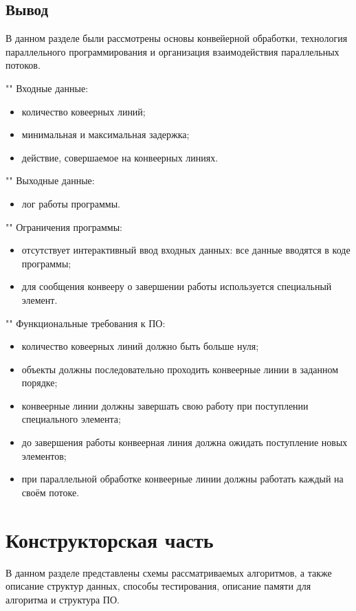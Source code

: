 \documentclass[12pt]{report}
\begin{document}
\section*{Вывод}
В данном разделе были рассмотрены основы конвейерной обработки, технология параллельного программирования и
организация взаимодействия параллельных потоков.

""\newline
Входные данные:
\begin{itemize}
	\item количество ковеерных линий;
	\item минимальная и максимальная задержка;
	\item действие, совершаемое на конвеерных линиях.
\end{itemize}

""\newline
Выходные данные:
\begin{itemize}
	\item лог работы программы.
\end{itemize}

""\newline
Ограничения программы:
\begin{itemize}
	\item отсутствует интерактивный ввод входных данных: все данные вводятся в коде программы;
	\item для сообщения конвееру о завершении работы используется специальный элемент.
\end{itemize}

""\newline
Функциональные требования к ПО:
\begin{itemize}
	\item количество ковеерных линий должно быть больше нуля;
	\item объекты должны последовательно проходить конвеерные линии в заданном порядке;
	\item конвеерные линии должны завершать свою работу при поступлении специального элемента;
	\item до завершения работы конвеерная линия должна ожидать поступление новых элементов;
	\item при параллельной обработке конвеерные линии должны работать каждый на своём потоке.
\end{itemize}

\newpage
\chapter{Конструкторская часть}
В данном разделе представлены схемы рассматриваемых алгоритмов, а также описание структур данных, способы тестирования, описание памяти для алгоритма и структура ПО.
\end{document}
